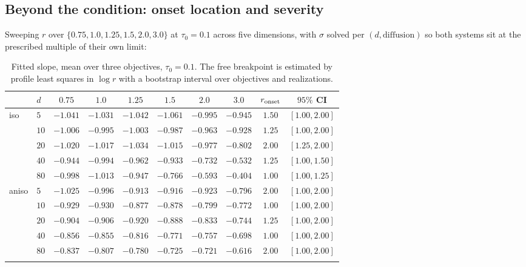\documentclass[pdflatex,sn-mathphys-num]{sn-jnl}
\theoremstyle{thmstyleone}
\theoremstyle{thmstyletwo}
\theoremstyle{thmstylethree}
\begin{document}
\subsection{Beyond the condition: onset location and severity}\label{sec:onset}

Sweeping $r$ over $\{0.75,1.0,1.25,1.5,2.0,3.0\}$ at $\tau_0=0.1$ across five dimensions, with $\sigma$ solved per $(d,\text{diffusion})$ so both systems sit at the prescribed multiple of their own limit:

\begin{table}[h]
\caption{Fitted slope, mean over three objectives, $\tau_0=0.1$. The free breakpoint is estimated by profile least squares in $\log r$ with a bootstrap interval over objectives and realizations.}\label{tab:onset}
\begin{tabular}{@{}llcccccccc@{}}
\toprule
& $d$ & $0.75$ & $1.0$ & $1.25$ & $1.5$ & $2.0$ & $3.0$ & $r_{\rm onset}$ & $95\%$ CI\\
\midrule
\multirow{5}{*}{iso}
 & $5$ & $-1.041$ & $-1.031$ & $-1.042$ & $-1.061$ & $-0.995$ & $-0.945$ & $1.50$ & $[1.00,2.00]$\\
 & $10$ & $-1.006$ & $-0.995$ & $-1.003$ & $-0.987$ & $-0.963$ & $-0.928$ & $1.25$ & $[1.00,2.00]$\\
 & $20$ & $-1.020$ & $-1.017$ & $-1.034$ & $-1.015$ & $-0.977$ & $-0.802$ & $2.00$ & $[1.25,2.00]$\\
 & $40$ & $-0.944$ & $-0.994$ & $-0.962$ & $-0.933$ & $-0.732$ & $-0.532$ & $1.25$ & $[1.00,1.50]$\\
 & $80$ & $-0.998$ & $-1.013$ & $-0.947$ & $-0.766$ & $-0.593$ & $-0.404$ & $1.00$ & $[1.00,1.25]$\\
\midrule
\multirow{5}{*}{aniso}
 & $5$ & $-1.025$ & $-0.996$ & $-0.913$ & $-0.916$ & $-0.923$ & $-0.796$ & $2.00$ & $[1.00,2.00]$\\
 & $10$ & $-0.929$ & $-0.930$ & $-0.877$ & $-0.878$ & $-0.799$ & $-0.772$ & $1.00$ & $[1.00,2.00]$\\
 & $20$ & $-0.904$ & $-0.906$ & $-0.920$ & $-0.888$ & $-0.833$ & $-0.744$ & $1.25$ & $[1.00,2.00]$\\
 & $40$ & $-0.856$ & $-0.855$ & $-0.816$ & $-0.771$ & $-0.757$ & $-0.698$ & $1.00$ & $[1.00,2.00]$\\
 & $80$ & $-0.837$ & $-0.807$ & $-0.780$ & $-0.725$ & $-0.721$ & $-0.616$ & $2.00$ & $[1.00,2.00]$\\
\botrule
\end{tabular}
\end{table}
\end{document}
